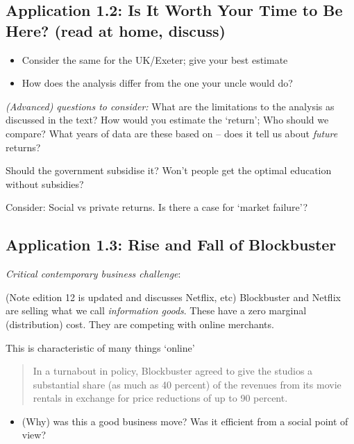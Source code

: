 \documentclass[]{article}
\providecommand{\tightlist}{%
  \setlength{\itemsep}{0pt}\setlength{\parskip}{0pt}}
\begin{document}
\hypertarget{application-1.2-is-it-worth-your-time-to-be-here-read-at-home-discuss}{%
\subsection{Application 1.2: Is It Worth Your Time to Be Here? (read at home, discuss)}\label{application-1.2-is-it-worth-your-time-to-be-here-read-at-home-discuss}}

\begin{itemize}
\item
  Consider the same for the UK/Exeter; give your best estimate
\item
  How does the analysis differ from the one your uncle would do?
\end{itemize}

\emph{(Advanced) questions to consider:}
What are the limitations to the analysis as discussed in the text?
How would you estimate the `return'; Who should we compare? What years of data are these based on -- does it tell us about \emph{future} returns?

Should the government subsidise it? Won't people get the optimal education without subsidies?

Consider: Social vs private returns. Is there a case for `market failure'?

\hypertarget{application-1.3-rise-and-fall-of-blockbuster}{%
\subsection{Application 1.3: Rise and Fall of Blockbuster}\label{application-1.3-rise-and-fall-of-blockbuster}}

\emph{Critical contemporary business challenge}:

(Note edition 12 is updated and discusses Netflix, etc) Blockbuster and Netflix are selling what we call \emph{information goods}. These have a zero marginal (distribution) cost. They are competing with online merchants.

This is characteristic of many things `online'

\begin{quote}
In a turnabout in policy, Blockbuster agreed to give the studios a substantial share (as much as 40 percent) of the revenues from its movie rentals in exchange for price reductions of up to 90 percent.
\end{quote}

\begin{itemize}
\tightlist
\item
  (Why) was this a good business move? Was it efficient from a social point of view?
\end{itemize}
\end{document}
